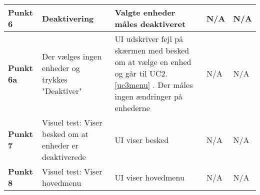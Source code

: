 \begin{center}
\begin{longtable}{|p{}|p{}|p{3cm}|p{3cm}|p{3cm}|}
\textbf{Punkt 6}		&Deaktivering			
					&Valgte enheder måles deaktiveret
					&N/A 
					&N/A \\\hline
															
\textbf{Punkt 6a}	&Der vælges ingen enheder og trykkes "Deaktiver"				
					&UI udskriver fejl på skærmen med besked om at vælge en enhed og går til UC2.\ref{uc3menu}	. 
					 Der måles ingen ændringer på enhederne
					&N/A 
					&N/A \\\hline
		
\textbf{Punkt 7}		&Visuel test: Viser besked om at enheder er deaktiverede
					&UI viser besked
					&N/A
					&N/A \\\hline
					
\textbf{Punkt 8}		&Visuel test: Viser hovedmenu
					&UI viser hovedmenu
					&N/A
					&N/A \\\hline
					

	\end{longtable}
	\label{ATUC3} 
\end{center}